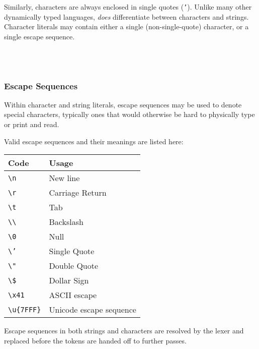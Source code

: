 Similarly, characters are always enclosed in single quotes (\texttt{'}).
Unlike many other dynamically typed languages, \Trilogy{} \emph{does} differentiate
between characters and strings. Character literals may contain either a
single (non-single-quote) character, or a single escape sequence.

\begin{bnf*}
     \\
     \\
\end{bnf*}

\subsubsection{Escape Sequences}
\label{sec:escapesequences}

Within character and string literals, escape sequences may be used to denote
special characters, typically ones that would otherwise be hard to physically
type or print and read.

Valid escape sequences and their meanings are listed here:

\begin{table}[H]
    \centering
\begin{tabular}[c]{|ll|}
    \hline
    \textbf{Code} & \textbf{Usage} \\
    \hline
    \texttt{\textbackslash n} & New line \\
    \texttt{\textbackslash r} & Carriage Return \\
    \texttt{\textbackslash t} & Tab \\
    \texttt{\textbackslash\textbackslash} & Backslash \\
    \texttt{\textbackslash 0} & Null \\
    \texttt{\textbackslash '} & Single Quote \\
    \texttt{\textbackslash "} & Double Quote \\
    \texttt{\textbackslash \$} & Dollar Sign \\ %
    \texttt{\textbackslash x41} & ASCII escape \\
    \texttt{\textbackslash u\{7FFF\}} & Unicode escape sequence \\
    \hline
\end{tabular}
\end{table}

Escape sequences in both strings and characters are resolved by the lexer
and replaced before the tokens are handed off to further passes.

